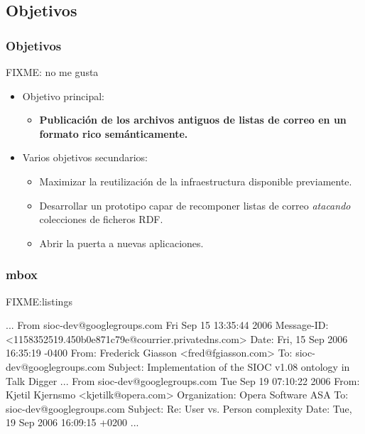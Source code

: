 \documentclass[spanish,notes=hide]{beamer}
\begin{document}
\subsection{Objetivos}
\frame
{
  \frametitle{Objetivos}
  FIXME: no me gusta
  \begin{itemize}
   \item<1-> Objetivo principal: 
     \begin{itemize}
      \item \textbf{Publicación de los archivos antiguos de listas de correo en un formato rico semánticamente.}
     \end{itemize}
   \item<2-> Varios objetivos secundarios:
	\begin{itemize}
	  \item Maximizar la reutilización de la infraestructura disponible previamente.
	  \item Desarrollar un prototipo capar de recomponer listas de correo \textit{atacando} 
		colecciones de ficheros RDF.
	  \item Abrir la puerta a nuevas aplicaciones.
     	\end{itemize}
  \end{itemize}
}
\frame
{
\frametitle{mbox}
FIXME:listings
\begin{center}
...
From sioc-dev@googlegroups.com Fri Sep 15 13:35:44 2006
Message-ID: <1158352519.450b0e871c79e@courrier.privatedns.com>
Date: Fri, 15 Sep 2006 16:35:19 -0400
From: Frederick Giasson <fred@fgiasson.com>
To: sioc-dev@googlegroups.com
Subject: Implementation of the SIOC v1.08 ontology in Talk Digger
...
From sioc-dev@googlegroups.com Tue Sep 19 07:10:22 2006
From: Kjetil Kjernsmo <kjetilk@opera.com>
Organization: Opera Software ASA
To: sioc-dev@googlegroups.com
Subject: Re: User vs. Person complexity
Date: Tue, 19 Sep 2006 16:09:15 +0200
...
\end{center}
}
\end{document}
